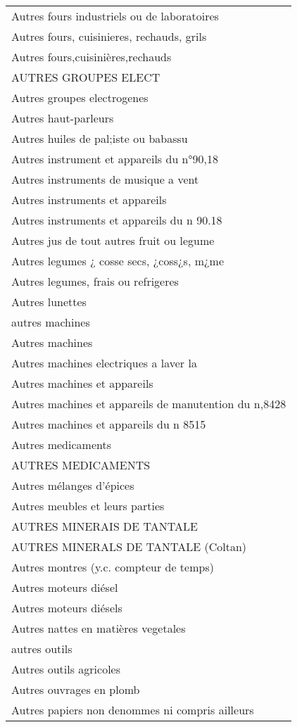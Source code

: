 \documentclass[
]{book}
\begin{document}
\begin{longtable}[t]{l}
Autres fours industriels ou de laboratoires\\
Autres fours, cuisinieres, rechauds, grils\\
Autres fours,cuisinières,rechauds\\
\addlinespace
AUTRES GROUPES ELECT\\
Autres groupes electrogenes\\
Autres haut-parleurs\\
Autres huiles de pal;iste ou babassu\\
Autres instrument et appareils du n°90,18\\
\addlinespace
Autres instruments de musique a vent\\
Autres instruments et appareils\\
Autres instruments et appareils du n 90.18\\
Autres jus de tout autres fruit ou legume\\
Autres legumes ¿ cosse secs, ¿coss¿s, m¿me\\
\addlinespace
Autres legumes, frais ou refrigeres\\
Autres lunettes\\
autres machines\\
Autres machines\\
Autres machines electriques a laver la\\
\addlinespace
Autres machines et appareils\\
Autres machines et appareils de manutention du n,8428\\
Autres machines et appareils du n 8515\\
Autres medicaments\\
AUTRES MEDICAMENTS\\
\addlinespace
Autres mélanges d'épices\\
Autres meubles et leurs parties\\
AUTRES MINERAIS DE TANTALE\\
AUTRES MINERALS DE TANTALE (Coltan)\\
Autres montres (y.c. compteur de temps)\\
\addlinespace
Autres moteurs diésel\\
Autres moteurs diésels\\
Autres nattes en matières vegetales\\
autres outils\\
Autres outils agricoles\\
\addlinespace
Autres ouvrages en plomb\\
Autres papiers non denommes ni compris ailleurs\\

\end{longtable}
\end{document}
